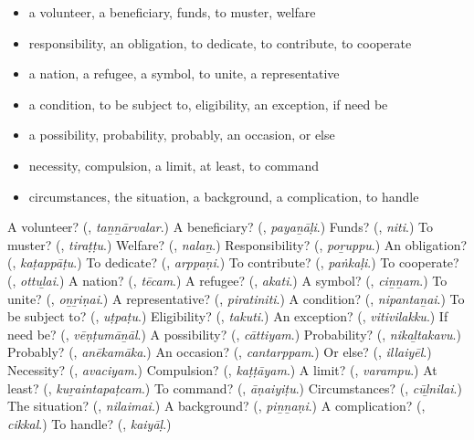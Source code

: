 \begin{itemize}
\raggedright
  \item a volunteer, a beneficiary, funds, to muster, welfare
  \item responsibility, an obligation, to dedicate, to contribute, to cooperate
  \item a nation, a refugee, a symbol, to unite, a representative
  \item a condition, to be subject to, eligibility, an exception, if need be
  \item a possibility, probability, probably, an occasion, or else
  \item necessity, compulsion, a limit, at least, to command
  \item circumstances, the situation, a background, a complication, to handle
\end{itemize}

\begin{tcolorbox}[breakable,colback=teal!4,colframe=teal!35!black,title={Before you move on}]
A volunteer? (\textbf{}, \emph{taṉṉārvalar}.) A beneficiary? (\textbf{}, \emph{payaṉāḷi}.) Funds? (\textbf{}, \emph{niti}.) To muster? (\textbf{}, \emph{tiraṭṭu}.) Welfare? (\textbf{}, \emph{nalaṉ}.) Responsibility? (\textbf{}, \emph{poṟuppu}.) An obligation? (\textbf{}, \emph{kaṭappāṭu}.) To dedicate? (\textbf{}, \emph{arppaṇi}.) To contribute? (\textbf{}, \emph{paṅkaḷi}.) To cooperate? (\textbf{}, \emph{ottuḻai}.) A nation? (\textbf{}, \emph{tēcam}.) A refugee? (\textbf{}, \emph{akati}.) A symbol? (\textbf{}, \emph{ciṉṉam}.) To unite? (\textbf{}, \emph{oṉṟiṇai}.) A representative? (\textbf{}, \emph{piratiniti}.) A condition? (\textbf{}, \emph{nipantaṉai}.) To be subject to? (\textbf{}, \emph{uṭpaṭu}.) Eligibility? (\textbf{}, \emph{takuti}.) An exception? (\textbf{}, \emph{vitivilakku}.) If need be? (\textbf{}, \emph{vēṇṭumāṉāl}.) A possibility? (\textbf{}, \emph{cāttiyam}.) Probability? (\textbf{}, \emph{nikaḻtakavu}.) Probably? (\textbf{}, \emph{anēkamāka}.) An occasion? (\textbf{}, \emph{cantarppam}.) Or else? (\textbf{}, \emph{illaiyēl}.) Necessity? (\textbf{}, \emph{avaciyam}.) Compulsion? (\textbf{}, \emph{kaṭṭāyam}.) A limit? (\textbf{}, \emph{varampu}.) At least? (\textbf{}, \emph{kuṟaintapaṭcam}.) To command? (\textbf{}, \emph{āṇaiyiṭu}.) Circumstances? (\textbf{}, \emph{cūḻnilai}.) The situation? (\textbf{}, \emph{nilaimai}.) A background? (\textbf{}, \emph{piṉṉaṇi}.) A complication? (\textbf{}, \emph{cikkal}.) To handle? (\textbf{}, \emph{kaiyāḷ}.)
\end{tcolorbox}
